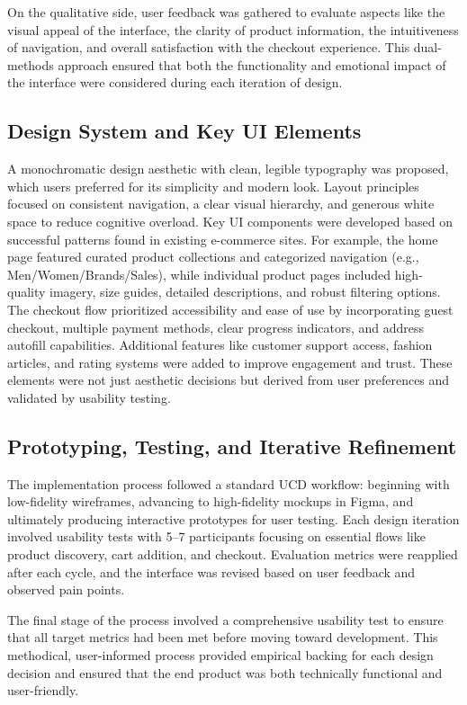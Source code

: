 \documentclass[10pt,twocolumn]{article}
\begin{document}
On the qualitative side, user feedback was gathered to evaluate aspects like the visual appeal of the interface, the clarity of product information, the intuitiveness of navigation, and overall satisfaction with the checkout experience. This dual-methods approach ensured that both the functionality and emotional impact of the interface were considered during each iteration of design.

\subsection{Design System and Key UI Elements}
A monochromatic design aesthetic with clean, legible typography was proposed, which users preferred for its simplicity and modern look. Layout principles focused on consistent navigation, a clear visual hierarchy, and generous white space to reduce cognitive overload. Key UI components were developed based on successful patterns found in existing e-commerce sites. For example, the home page featured curated product collections and categorized navigation (e.g., Men/Women/Brands/Sales), while individual product pages included high-quality imagery, size guides, detailed descriptions, and robust filtering options. The checkout flow prioritized accessibility and ease of use by incorporating guest checkout, multiple payment methods, clear progress indicators, and address autofill capabilities. Additional features like customer support access, fashion articles, and rating systems were added to improve engagement and trust. These elements were not just aesthetic decisions but derived from user preferences and validated by usability testing.
\subsection{Prototyping, Testing, and Iterative Refinement}
The implementation process followed a standard UCD workflow: beginning with low-fidelity wireframes, advancing to high-fidelity mockups in Figma, and ultimately producing interactive prototypes for user testing. Each design iteration involved usability tests with 5–7 participants focusing on essential flows like product discovery, cart addition, and checkout. Evaluation metrics were reapplied after each cycle, and the interface was revised based on user feedback and observed pain points.

The final stage of the process involved a comprehensive usability test to ensure that all target metrics had been met before moving toward development. This methodical, user-informed process provided empirical backing for each design decision and ensured that the end product was both technically functional and user-friendly.
\end{document}
